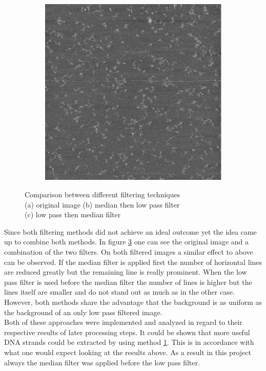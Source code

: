 \documentclass{article}
\begin{document}
\begin{figure}[H]
\begin{subfigure}[b]{0.321\textwidth}
		\caption{}
		\label{fig:MedianLowPassFilt}
	\end{subfigure}
	\hspace{\fill}
	\begin{subfigure}[b]{0.321\textwidth}
		\includegraphics[width=\linewidth]{both_right_order}
		\caption{}
		\label{fig:LowPassMedianFilt}
	\end{subfigure}
	\captionsetup{justification=centering}
	\caption{Comparison between different filtering techniques \\
		(a) original image
		(b) median then low pass filter \\
		(c) low pass then median filter}
	\label{fig:lowpassCompare2}
\end{figure}

Since both filtering methods did not achieve an ideal outcome yet the idea came up to combine both methods. In figure \ref{fig:lowpassCompare2} one can see the original image and a combination of the two filters. On both filtered images a similar effect to above can be observed. If the median filter is applied first the number of horizontal lines are reduced greatly but the remaining line is really prominent. When the low pass filter is used before the median filter the number of lines is higher but the lines itself are smaller and do not stand out as much as in the other case. \\
However, both methods share the advantage that the background is as uniform as the background of an only low pass filtered image. \\
Both of these approaches were implemented and analyzed in regard to their respective results of later processing steps. It could be shown that more useful DNA strands could be extracted by using method \ref{fig:MedianLowPassFilt}. This is in accordance with what one would expect looking at the results above. As a result in this project always the median filter was applied before the low pass filter.\\
\end{document}
